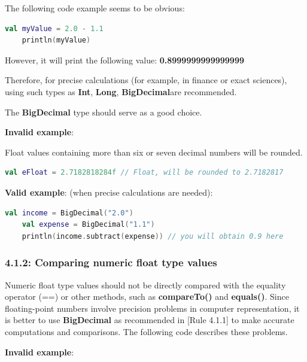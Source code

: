 The following code example seems to be obvious: 

\begin{lstlisting}[language=Kotlin]
    val myValue = 2.0 - 1.1
    println(myValue)
\end{lstlisting}


However, it will print the following value: \textbf{0.8999999999999999}



Therefore, for precise calculations (for example, in finance or exact sciences), using such types as \textbf{Int}, \textbf{Long}, \textbf{BigDecimal}are recommended.

The \textbf{BigDecimal} type should serve as a good choice.



\textbf{Invalid example}:

Float values containing more than six or seven decimal numbers will be rounded.

\begin{lstlisting}[language=Kotlin]
 val eFloat = 2.7182818284f // Float, will be rounded to 2.7182817
\end{lstlisting}


\textbf{Valid example}: (when precise calculations are needed): 

\begin{lstlisting}[language=Kotlin]
    val income = BigDecimal("2.0")
    val expense = BigDecimal("1.1")
    println(income.subtract(expense)) // you will obtain 0.9 here
\end{lstlisting}


\subsubsection*{\textbf{4.1.2: Comparing numeric float type values}}
\leavevmode\newline

\label{sec:4.1.2}

Numeric float type values should not be directly compared with the equality operator (==) or other methods, such as \textbf{compareTo()} and \textbf{equals()}. Since floating-point numbers involve precision problems in computer representation, it is better to use \textbf{BigDecimal} as recommended in [Rule 4.1.1] to make accurate computations and comparisons. The following code describes these problems.



\textbf{Invalid example}:


